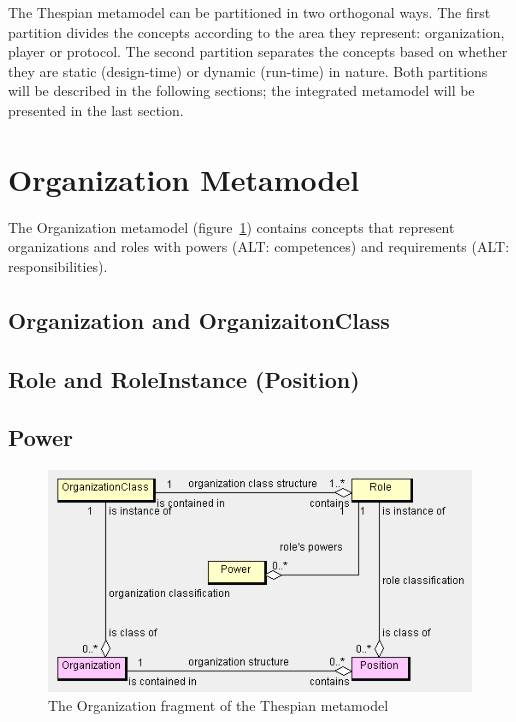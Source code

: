 The Thespian metamodel can be partitioned in two orthogonal ways.
The first partition divides the concepts according to the area they represent: organization, player or protocol.
The second partition separates the concepts based on whether they are static (design-time) or dynamic (run-time) in nature.
Both partitions will be described in the following sections; the integrated metamodel will be presented in the last section.

\section{Organization Metamodel}

The Organization metamodel (figure~\ref{figure:thespian-organization-metamodel}) contains concepts that represent organizations and roles with powers (ALT: competences) and requirements (ALT: responsibilities).

\subsection*{Organization and OrganizaitonClass}



\subsection*{Role and RoleInstance (Position)}

\subsection*{Power}

\begin{figure}[ht]
	\centering
	\includegraphics[width=\textwidth]{images/thespian-organization-metamodel.png}
	\caption{The Organization fragment of the Thespian metamodel}
	\label{figure:thespian-organization-metamodel}
\end{figure}

